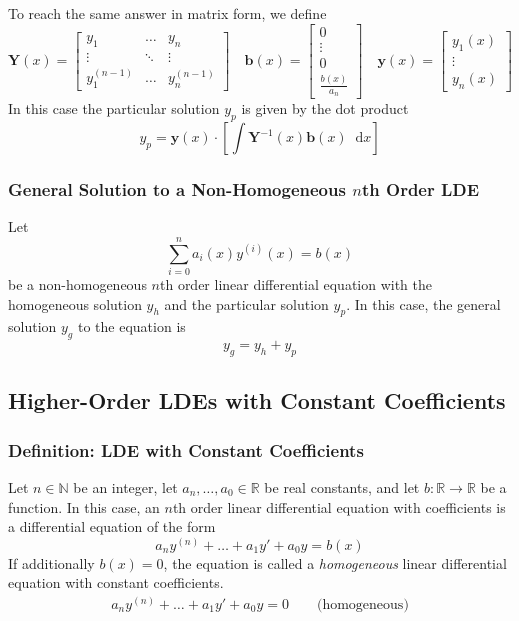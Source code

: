 \documentclass[11pt, a4paper]{article}
\newcommand{\diff}{\mathop{}\!\mathrm{d}} %
\newcommand{\R}{\mathbb{R}} %
\begin{document}
To reach the same answer in matrix form, we define
\[
	\mathbf{Y}(x) = 
	\begin{bmatrix}
		y_1 & \dots & y_n \\
		\vdots & \ddots & \vdots \\
		y_1^{(n-1)} & \dots & y_n^{(n-1)}
	\end{bmatrix}
	\quad 
	\bm{b}(x) = 
	\begin{bmatrix}
		0 \\
		\vdots \\
		0 \\[0.5ex]
		\frac{b(x)}{a_n}
	\end{bmatrix}
	\quad 
	\bm{y}(x) =
	\begin{bmatrix}
		y_1(x) \\
		\vdots \\
		y_n(x)
	\end{bmatrix}
\]
In this case the particular solution $ y_p $ is given by the dot product
\begin{equation*}
	y_p = \bm{y}(x) \cdot \left[\int \mathbf{Y}^{-1}(x) \bm{b}(x) \diff x \right]
\end{equation*}

\subsubsection{General Solution to a Non-Homogeneous $ n $th Order LDE}
Let 
\begin{equation*}
	\sum_{i = 0}^{n} a_i(x) y^{(i)}(x) = b(x) 
\end{equation*}
be a non-homogeneous $ n $th order linear differential equation with the homogeneous solution $ y_h $ and the particular solution $ y_p $. In this case, the general solution $ y_g $ to the equation is
\begin{equation*}
	y_g = y_h + y_p
\end{equation*}

\subsection{Higher-Order LDEs with Constant Coefficients}

\subsubsection{Definition: LDE with Constant Coefficients}
Let $ n \in \mathbb{N} $ be an integer, let $ a_n, \dots, a_0 \in \R $ be real constants, and let $ b : \R \to \R $ be a function. In this case, an $ n $th order linear differential equation with coefficients is a differential equation of the form 
\begin{equation*}
	a_n y^{(n)} + \dots + a_1 y' + a_0 y = b(x)
\end{equation*}
If additionally $ b(x) = 0 $, the equation is called a \textit{homogeneous} linear differential equation with constant coefficients.
\begin{align*}
	a_n y^{(n)} + \dots + a_1 y' + a_0 y = 0 \qquad \text{(homogeneous)}
\end{align*}
\end{document}
